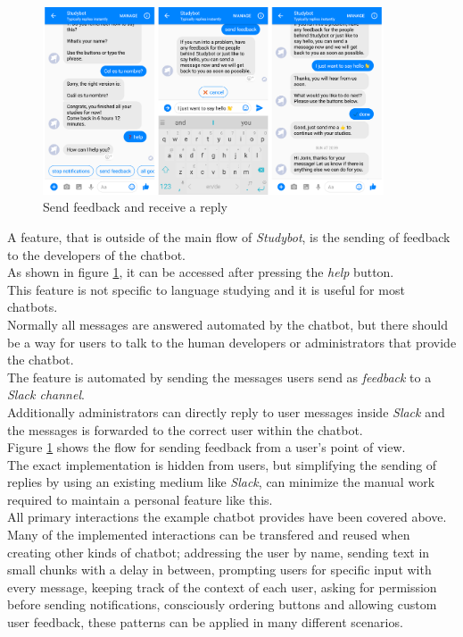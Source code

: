\begin{figure}[h]
  \centering
  \includegraphics[width=0.9\textwidth]{images/interface/09-feedback.png}
	\caption{Send feedback and receive a reply}
	\label{fig:09-feedback}
\end{figure}

\label{slackhook}

A feature, that is outside of the main flow of \emph{Studybot}, is the sending of feedback to the developers of the chatbot.
\\
As shown in figure \ref{fig:09-feedback}, it can be accessed after pressing the \emph{help} button.
\\
This feature is not specific to language studying and it is useful for most chatbots.
\\
Normally all messages are answered automated by the chatbot,
but there should be a way for users to talk to the human developers or administrators that provide the chatbot.
\\
The feature is automated by sending the messages users send as \emph{feedback}
to a \emph{Slack channel}.\cite{slack}
\\
Additionally administrators can directly reply to user messages inside \emph{Slack}
and the messages is forwarded to the correct user within the chatbot.
\\
Figure \ref{fig:09-feedback} shows the flow for sending feedback from a user's point of view.
\\
The exact implementation is hidden from users,
but simplifying the sending of replies by using an existing medium like \emph{Slack},
can minimize the manual work required to maintain a personal feature like this.
\\


All primary interactions the example chatbot provides have been covered above.
\\
Many of the implemented interactions can be transfered and reused when creating other kinds of chatbot;
addressing the user by name,
sending text in small chunks with a delay in between,
prompting users for specific input with every message,
keeping track of the context of each user,
asking for permission before sending notifications,
consciously ordering buttons and
allowing custom user feedback,
these patterns can be applied in many different scenarios.
\\

